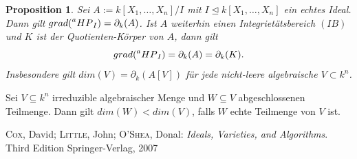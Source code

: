 \documentclass{beamer}
\newtheorem{proposition}{Proposition}
\newcommand*{\R}{k[X_{1},\ldots,X_{n}]}
\newcommand*{\indx}[2]{{#1}_{#2}}
\newcommand*{\hp}[1]{$\prescript{a}{}{HP}_{#1}$}
\begin{document}
\begin{frame}
	\begin{proposition}
		Sei $A:=\R/I$ mit $I\unlhd\R$ ein echtes Ideal. Dann gilt $grad(\textnormal{\hp{I}})=\indx{\partial}{k}(A)$. Ist $A$ weiterhin einen Integrietätsbereich $(IB)$ und $K$ ist der Quotienten-Körper von $A$, dann gilt
		\begin{displaymath}
		grad(\textnormal{\hp{I}})=\indx{\partial}{k}(A)=\indx{\partial}{k}(K).
		\end{displaymath}
		Insbesondere gilt $dim(V)=\indx{\partial}{k}(A[V])$ für jede nicht-leere algebraische $V\subset k^n$.\\
	\end{proposition}
\end{frame}

\begin{frame}
	\begin{lemma}
		Sei $V\subseteq k^n$ irreduzible algebraischer Menge und $W\subseteq V$ abgeschlossenen Teilmenge. Dann gilt $dim(W)<dim(V)$, falls $W$ echte Teilmenge von $V$ ist.
	\end{lemma}
\end{frame}

\begin{frame}
	\begin{thebibliography}{99}
		\textsc{Cox}, David; \textsc{Little}, John; \textsc{O'Shea}, Donal:
		\newblock \emph{Ideals, Varieties, and Algorithms}.
		\newblock Third Edition
		\newblock Springer-Verlag, 2007
	\end{thebibliography}
\end{frame}
\end{document}
